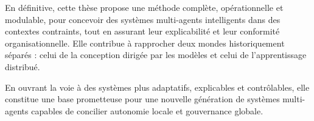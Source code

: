 \noindent
En définitive, cette thèse propose une méthode complète, opérationnelle et modulable, pour concevoir des systèmes multi-agents intelligents dans des contextes contraints, tout en assurant leur explicabilité et leur conformité organisationnelle. Elle contribue à rapprocher deux mondes historiquement séparés : celui de la conception dirigée par les modèles et celui de l’apprentissage distribué.

En ouvrant la voie à des systèmes plus adaptatifs, explicables et contrôlables, elle constitue une base prometteuse pour une nouvelle génération de systèmes multi-agents capables de concilier autonomie locale et gouvernance globale.

\clearpage
\thispagestyle{empty}
\null
\newpage

